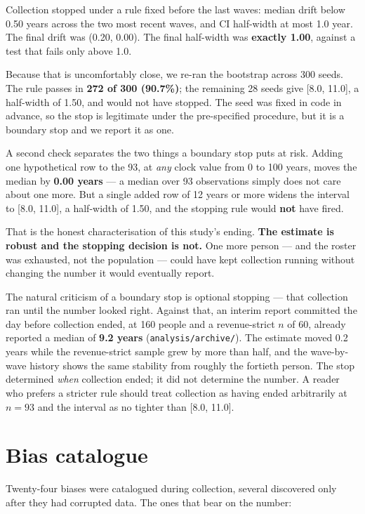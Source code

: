 \documentclass[11pt]{article}
\begin{document}
Collection stopped under a rule fixed before the last waves: median drift below
0.50 years across the two most recent waves, and CI half-width at most 1.0 year.
The final drift was (0.20, 0.00). The final half-width was \textbf{exactly
1.00}, against a test that fails only above 1.0.

Because that is uncomfortably close, we re-ran the bootstrap across 300 seeds.
The rule passes in \textbf{272 of 300 (90.7\%)}; the remaining 28 seeds give
[8.0, 11.0], a half-width of 1.50, and would not have stopped. The seed was
fixed in code in advance, so the stop is legitimate under the pre-specified
procedure, but it is a boundary stop and we report it as one.

A second check separates the two things a boundary stop puts at risk. Adding one
hypothetical row to the 93, at \emph{any} clock value from 0 to 100 years, moves
the median by \textbf{0.00 years} --- a median over 93 observations simply does
not care about one more. But a single added row of 12 years or more widens the
interval to [8.0, 11.0], a half-width of 1.50, and the stopping rule would
\textbf{not} have fired.

That is the honest characterisation of this study's ending. \textbf{The estimate
is robust and the stopping decision is not.} One more person --- and the roster
was exhausted, not the population --- could have kept collection running without
changing the number it would eventually report.

The natural criticism of a boundary stop is optional stopping --- that
collection ran until the number looked right. Against that, an interim report
committed the day before collection ended, at 160 people and a revenue-strict
$n$ of 60, already reported a median of \textbf{9.2 years}
(\texttt{analysis/archive/}). The estimate moved 0.2 years while the
revenue-strict sample grew by more than half, and the wave-by-wave history shows
the same stability from roughly the fortieth person. The stop determined
\emph{when} collection ended; it did not determine the number. A reader who
prefers a stricter rule should treat collection as having ended arbitrarily at
$n=93$ and the interval as no tighter than [8.0, 11.0].

\section{Bias catalogue}

Twenty-four biases were catalogued during collection, several discovered only
after they had corrupted data. The ones that bear on the number:
\end{document}
